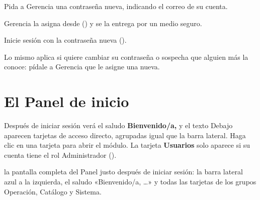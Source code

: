 \begin{pasos}
  \item Pida a Gerencia una contraseña nueva, indicando el correo de su cuenta.
  \item Gerencia la asigna desde  () y se la
        entrega por un medio seguro.
  \item Inicie sesión con la contraseña nueva ().
\end{pasos}

\begin{nota}
Lo mismo aplica si quiere cambiar su contraseña o sospecha que alguien más la conoce: pídale a
Gerencia que le asigne una nueva.
\end{nota}

\section{El Panel de inicio}\label{sec:panel-inicio}


Después de iniciar sesión verá el saludo \textbf{Bienvenido/a, } y el texto
 Debajo aparecen tarjetas de acceso directo, agrupadas igual que la barra lateral.
Haga clic en una tarjeta para abrir el módulo. La tarjeta \textbf{Usuarios} solo aparece si su
cuenta tiene el rol Administrador ().

  {la pantalla completa del Panel justo después de iniciar sesión: la barra lateral azul a la
   izquierda, el saludo «Bienvenido/a, …» y todas las tarjetas de los grupos Operación, Catálogo y
   Sistema.}

